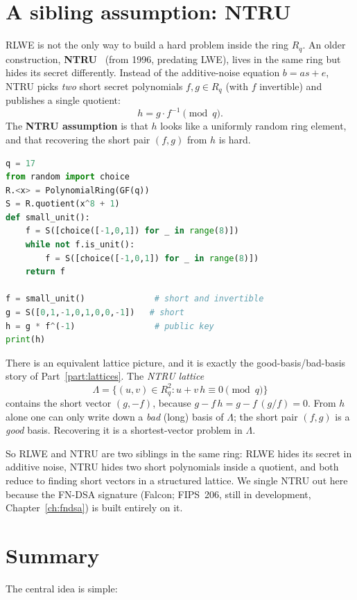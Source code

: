 \section{A sibling assumption: NTRU}
\label{sec:ntru}

RLWE is not the only way to build a hard problem inside the ring $R_q$. An older construction, \textbf{NTRU}~\cite{ntru1998} (from 1996, predating LWE), lives in the same ring but hides its secret differently. Instead of the additive-noise equation $b = a s + e$, NTRU picks \emph{two} short secret polynomials $f, g \in R_q$ (with $f$ invertible) and publishes a single quotient:
\[
h = g \cdot f^{-1} \pmod q.
\]
The \textbf{NTRU assumption} is that $h$ looks like a uniformly random ring element, and that recovering the short pair $(f,g)$ from $h$ is hard.

\begin{lstlisting}[language=Python]
q = 17
from random import choice
R.<x> = PolynomialRing(GF(q))
S = R.quotient(x^8 + 1)
def small_unit():
    f = S([choice([-1,0,1]) for _ in range(8)])
    while not f.is_unit():
        f = S([choice([-1,0,1]) for _ in range(8)])
    return f

f = small_unit()              # short and invertible
g = S([0,1,-1,0,1,0,0,-1])   # short
h = g * f^(-1)                # public key
print(h)
\end{lstlisting}

There is an equivalent lattice picture, and it is exactly the good-basis/bad-basis story of Part~\ref{part:lattices}. The \emph{NTRU lattice}
\[
\Lambda = \{ (u,v) \in R_q^2 : u + v\,h \equiv 0 \pmod q \}
\]
contains the short vector $(g, -f)$, because $g - f\,h = g - f\,(g/f) = 0$. From $h$ alone one can only write down a \emph{bad} (long) basis of $\Lambda$; the short pair $(f,g)$ is a \emph{good} basis. Recovering it is a shortest-vector problem in $\Lambda$.

So RLWE and NTRU are two siblings in the same ring: RLWE hides its secret in additive noise, NTRU hides two short polynomials inside a quotient, and both reduce to finding short vectors in a structured lattice. We single NTRU out here because the FN-DSA signature (Falcon; FIPS~206, still in development, Chapter~\ref{ch:fndsa}) is built entirely on it.

\section{Summary}

The central idea is simple:

